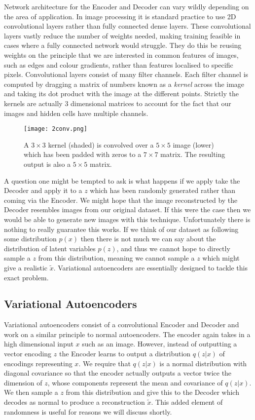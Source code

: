 \documentclass{article}
\numberwithin{figure}{section}
\theoremstyle{definition}
\begin{document}
Network architecture for the Encoder and Decoder can vary wildly depending on the area of application.
In image processing it is standard practice to use 2D convolutional layers rather than fully connected dense layers.
These convolutional layers vastly reduce the number of weights needed, making training feasible in cases where a fully connected network would struggle.
They do this be reusing weights on the principle that we are interested in common features of images, such as edges and colour gradients, rather than features localised to specific pixels.
Convolutional layers consist of many filter channels.
Each filter channel is computed by dragging a matrix of numbers known as a \textit{kernel} across the image and taking its dot product with the image at the different points.
Strictly the kernels are actually 3 dimensional matrices to account for the fact that our images and hidden cells have multiple channels.

\begin{figure}[h]
  \centering
  \texttt{[image: 2conv.png]}
  \caption{A $3 \times 3$ kernel (shaded) is convolved over a $5 \times 5$ image (lower) which has been padded with zeros to a $7 \times 7$ matrix. The resulting output is also a $5 \times 5$ matrix.}
\end{figure}%

A question one might be tempted to ask is what happens if we apply take the Decoder and apply it to a $z$ which has been randomly generated rather than coming via the Encoder.
We might hope that the image reconstructed by the Decoder resembles images from our original dataset.
If this were the case then we would be able to generate new images with this technique.
Unfortunately there is nothing to really guarantee this works.
If we think of our dataset as following some distribution $p(x)$ then there is not much we can say about the distribution of latent variables $p(z)$, and thus we cannot hope to directly sample a $z$ from this distribution, meaning we cannot sample a $z$ which might give a realistic $\widetilde{x}$.
Variational autoencoders are essentially designed to tackle this exact problem.


\subsection{Variational Autoencoders}

Variational autoencoders consist of a convolutional Encoder and Decoder and work on a similar principle to normal autoencoders.
The encoder again takes in a high dimensional input $x$ such as an image.
However, instead of outputting a vector encoding $z$ the Encoder learns to output a distribution $q(z|x)$ of encodings representing $x$.
We require that $q(z|x)$ is a normal distribution with diagonal covariance so that the encoder actually outputs a vector twice the dimension of $z$, whose components represent the mean and covariance of $q(z|x)$.
We then sample a $z$ from this distribution and give this to the Decoder which decodes as normal to produce a reconstruction $\widetilde{x}$.
This added element of randomness is useful for reasons we will discuss shortly.
\end{document}
